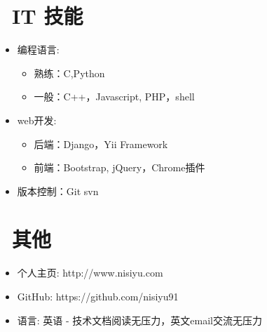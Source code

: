 \documentclass{resume}
\begin{document}

\section{\faCogs\ IT 技能}
\begin{itemize}[parsep=0.5ex]
  \item 编程语言: 
  \begin{itemize}
  \item 熟练：C,Python 
  \item 一般：C++，Javascript, PHP，shell
  \end{itemize}
  \item web开发: 
  \begin{itemize}
  \item 后端：Django，Yii Framework
  \item 前端：Bootstrap, jQuery，Chrome插件
  \end{itemize}
  \item 版本控制：Git svn
\end{itemize}


\section{\faInfo\ 其他}
\begin{itemize}[parsep=0.5ex]
  \item 个人主页: http://www.nisiyu.com
  \item GitHub: https://github.com/nisiyu91
  \item 语言: 英语 - 技术文档阅读无压力，英文email交流无压力 
\end{itemize}

%
%
\end{document}
